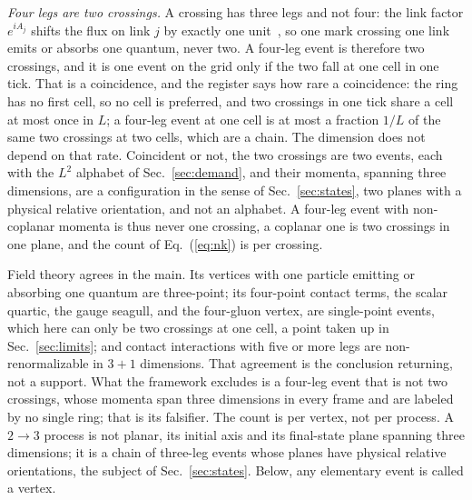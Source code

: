 \documentclass[aps,prd,twocolumn,superscriptaddress,nofootinbib]{revtex4-2}
\begin{document}
\textit{Four legs are two crossings.} A crossing has three legs and not four: the link factor $e^{iA_j}$ shifts the flux on link $j$ by exactly one unit~\cite{kogut1975}, so one mark crossing one link emits or absorbs one quantum, never two. A four-leg event is therefore two crossings, and it is one event on the grid only if the two fall at one cell in one tick. That is a coincidence, and the register says how rare a coincidence: the ring has no first cell, so no cell is preferred, and two crossings in one tick share a cell at most once in $L$; a four-leg event at one cell is at most a fraction $1/L$ of the same two crossings at two cells, which are a chain. The dimension does not depend on that rate. Coincident or not, the two crossings are two events, each with the $L^2$ alphabet of Sec.~\ref{sec:demand}, and their momenta, spanning three dimensions, are a configuration in the sense of Sec.~\ref{sec:states}, two planes with a physical relative orientation, and not an alphabet. A four-leg event with non-coplanar momenta is thus never one crossing, a coplanar one is two crossings in one plane, and the count of Eq.~(\ref{eq:nk}) is per crossing.

Field theory agrees in the main. Its vertices with one particle emitting or absorbing one quantum are three-point; its four-point contact terms, the scalar quartic, the gauge seagull, and the four-gluon vertex, are single-point events, which here can only be two crossings at one cell, a point taken up in Sec.~\ref{sec:limits}; and contact interactions with five or more legs are non-renormalizable in $3+1$ dimensions. That agreement is the conclusion returning, not a support. What the framework excludes is a four-leg event that is not two crossings, whose momenta span three dimensions in every frame and are labeled by no single ring; that is its falsifier. The count is per vertex, not per process. A $2\to3$ process is not planar, its initial axis and its final-state plane spanning three dimensions; it is a chain of three-leg events whose planes have physical relative orientations, the subject of Sec.~\ref{sec:states}. Below, any elementary event is called a vertex.
\end{document}
